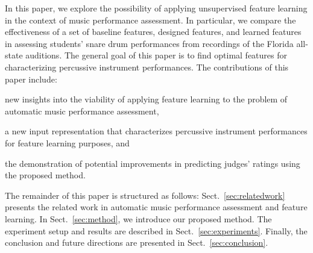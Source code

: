 \documentclass[conference]{IEEEtran}
\begin{document}
In this paper, we explore the possibility of applying unsupervised feature learning in the context of music performance assessment. In particular, we compare the effectiveness of a set of baseline features, designed features, and learned features in assessing students' snare drum performances from recordings of the Florida all-state auditions. The general goal of this paper is to find optimal features for characterizing percussive instrument performances. The contributions of this paper include:
\begin{inparaenum}[(i)]
	\item   new insights into the viability of applying feature learning to the problem of automatic music performance assessment, 
    \item   a new input representation that characterizes percussive instrument performances for feature learning purposes, and 
    \item   the demonstration of potential improvements in predicting judges' ratings using the proposed method.
\end{inparaenum} 

The remainder of this paper is structured as follows: Sect.~\ref{sec:relatedwork} presents the related work in automatic music performance assessment and feature learning. In Sect.~\ref{sec:method}, we introduce our proposed method. The experiment setup and results are described in Sect.~\ref{sec:experiments}. Finally, the conclusion and future directions are presented in Sect.~\ref{sec:conclusion}.
\end{document}
